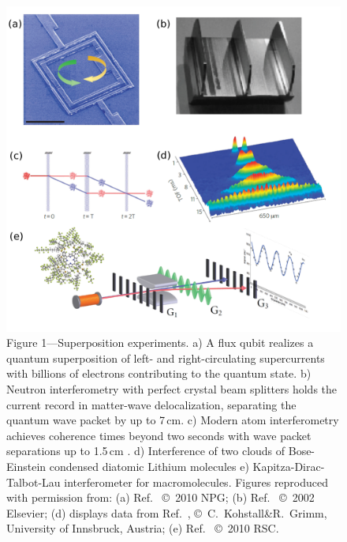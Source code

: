 \documentclass[12pt]{article}
\begin{document}
\begin{figure}
\includegraphics[width=1.04\columnwidth]{Fig1-arxiv.pdf}
\small{Figure 1---Superposition experiments.}
a) A flux qubit realizes a quantum superposition of left- and right-circulating supercurrents\cite{Friedman2000_long} with billions of 
electrons contributing to the quantum state. 
b) Neutron interferometry with perfect crystal beam splitters holds the current record in matter-wave delocalization\cite{Zawisky2002}, separating the 
quantum wave packet by up to 7\,cm.  
c) Modern atom interferometry achieves coherence times beyond two seconds with wave packet separations up to 1.5\,cm  \cite{Muentinga2013,Dickerson2013,Dimopoulos2007}.
d) Interference of two clouds of Bose-Einstein condensed diatomic Lithium molecules \cite{Kohstall2011}
e) Kapitza-Dirac-Talbot-Lau interferometer for macromolecules\cite{Gerlich2007,Tuexen2010,Eibenberger2013}.
Figures reproduced with permission from: ({a}) Ref.\  \copyright\  2010 NPG; ({b}) Ref.\  \copyright\ 2002 Elsevier; ({d}) displays data from Ref.\ , \copyright\ C.~Kohstall\&R.~Grimm, University of Innsbruck, Austria; ({e}) Ref.\  \copyright\ 2010 RSC.
\end{figure} 
\end{document}
